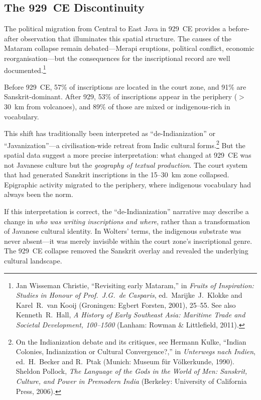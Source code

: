 \documentclass[12pt,a4paper]{article}
\begin{document}
\subsection{The 929~CE Discontinuity}

The political migration from Central to East Java in 929~CE provides a before-after observation that illuminates this spatial structure.
The causes of the Mataram collapse remain debated---Merapi eruptions, political conflict, economic reorganisation---but the consequences for the inscriptional record are well documented.\footnote{Jan Wisseman Christie, ``Revisiting early Mataram,'' in \emph{Fruits of Inspiration: Studies in Honour of Prof.\ J.G.\ de Casparis}, ed.\ Marijke~J.\ Klokke and Karel~R.\ van Kooij (Groningen: Egbert Forsten, 2001), 25--55. See also Kenneth~R.\ Hall, \emph{A History of Early Southeast Asia: Maritime Trade and Societal Development, 100--1500} (Lanham: Rowman \& Littlefield, 2011).}

Before 929~CE, 57\% of inscriptions are located in the court zone, and 91\% are Sanskrit-dominant.
After 929, 53\% of inscriptions appear in the periphery ($>$30~km from volcanoes), and 89\% of those are mixed or indigenous-rich in vocabulary.

This shift has traditionally been interpreted as ``de-Indianization'' or ``Javanization''---a civilisation-wide retreat from Indic cultural forms.\footnote{On the Indianization debate and its critiques, see Hermann Kulke, ``Indian Colonies, Indianization or Cultural Convergence?,'' in \emph{Unterwegs nach Indien}, ed.\ H.\ Becker and R.\ Ptak (Munich: Museum f\"{u}r V\"{o}lkerkunde, 1990). Sheldon Pollock, \emph{The Language of the Gods in the World of Men: Sanskrit, Culture, and Power in Premodern India} (Berkeley: University of California Press, 2006).}
But the spatial data suggest a more precise interpretation: what changed at 929~CE was not Javanese culture but the \emph{geography of textual production}.
The court system that had generated Sanskrit inscriptions in the 15--30~km zone collapsed.
Epigraphic activity migrated to the periphery, where indigenous vocabulary had always been the norm.

If this interpretation is correct, the ``de-Indianization'' narrative may describe a change in \emph{who was writing inscriptions and where}, rather than a transformation of Javanese cultural identity.
In Wolters' terms, the indigenous substrate was never absent---it was merely invisible within the court zone's inscriptional genre.
The 929~CE collapse removed the Sanskrit overlay and revealed the underlying cultural landscape.
\end{document}

